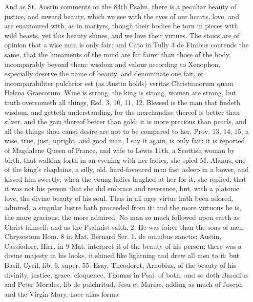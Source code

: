 {And as St. Austin comments on the 84th Psalm, there is a peculiar
beauty of justice, and inward beauty, which we see with the eyes of our
hearts, love, and are enamoured with, as in martyrs, though their
bodies be torn in pieces with wild beasts, yet this beauty shines, and
we love their virtues. The stoics are of opinion that a wise man
is only fair; and Cato in Tully 3 de Finibus contends the same, that
the lineaments of the mind are far fairer than those of the body,
incomparably beyond them: wisdom and valour according to
Xenophon, especially deserve the name of beauty, and denominate
one fair, et incomparabiliter pulchrior est (as Austin holds) veritas
Christianorum quam Helena Graecorum. Wine is strong, the king is
strong, women are strong, but truth overcometh all things, Esd.  3,
10, 11, 12. Blessed is the man that findeth wisdom, and getteth
understanding, for the merchandise thereof is better than silver, and
the gain thereof better than gold: it is more precious than pearls, and
all the things thou canst desire are not to be compared to her, Prov.
 13, 14, 15, a wise, true, just, upright, and good man, I say it
again, is only fair: it is reported of Magdalene Queen of France,
and wife to Lewis 11th, a Scottish woman by birth, that walking forth
in an evening with her ladies, she spied M. Alanus, one of the king's
chaplains, a silly, old, hard-favoured man fast asleep in a
bower, and kissed him sweetly; when the young ladies laughed at her for
it, she replied, that it was not his person that she did embrace and
reverence, but, with a platonic love, the divine beauty of his
soul. Thus in all ages virtue hath been adored, admired, a singular
lustre hath proceeded from it: and the more virtuous he is, the more
gracious, the more admired. No man so much followed upon earth as
Christ himself: and as the Psalmist saith,  2, He was fairer than
the sons of men. Chrysostom Hom. 8 in Mat. Bernard Ser. 1. de omnibus
sanctis; Austin, Cassiodore, Hier. in 9 Mat. interpret it of the
beauty of his person; there was a divine majesty in his looks, it
shined like lightning and drew all men to it: but Basil, Cyril, lib. 6.
super. 55. Esay. Theodoret, Arnobius, \etc{} of the beauty of his
divinity, justice, grace, eloquence, \etc{} Thomas in Psal.  of both;
and so doth Baradius and Peter Morales, lib de pulchritud. Jesu et
Mariae, adding as much of Joseph and the Virgin Mary,-haec alias forma
}
